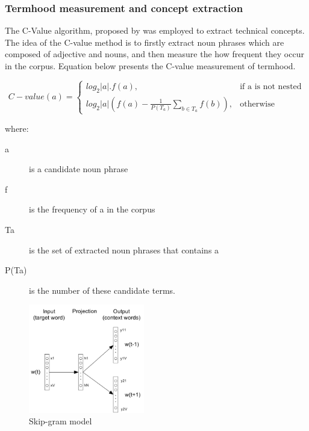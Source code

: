 \documentclass[NewProceedings, InsideFigs]{ascelike} %
\begin{document}
\subsubsection{Termhood measurement and concept extraction}
The C-Value algorithm, proposed by \cite{Frantzi20} was employed to extract technical concepts. The idea of the C-value method is to firstly extract noun phrases which are composed of adjective and nouns, and then measure the how frequent they occur in the corpus. Equation below presents the C-value measurement of termhood.

\begin{equation}
    C-value(a)=
    \begin{cases}
      log_2|a|.f(a), & \text{if a is not nested} \\
      log_2|a|(f(a)-\frac{1}{P(T_a)}\sum_{b\in T_a} f(b)), & \text{otherwise}
    \end{cases}
  \end{equation}
  
where:
\begin{description}
\item[a] is a candidate noun phrase
\item[f] is the frequency of a in the corpus
\item[Ta] is the set of extracted noun phrases that contains a
\item[P(Ta)] is the number of these candidate terms.
\end{description}

\begin{figure}[t]
\centering
\includegraphics[width=0.45\textwidth]{skip-gram-model}
\caption{Skip-gram model}
\label{fig:skip-gram}
\end{figure}
\end{document}
